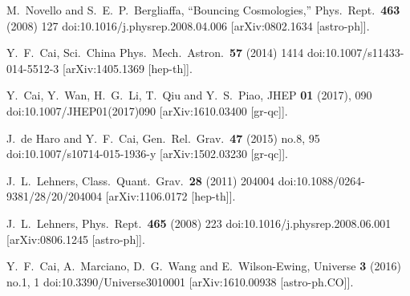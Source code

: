 \documentclass{article}
\begin{document}
\begin{thebibliography}{99}
M.~Novello and S.~E.~P.~Bergliaffa,
 ``Bouncing Cosmologies,''
Phys.\ Rept.\ {\bf 463} (2008) 127
doi:10.1016/j.physrep.2008.04.006
[arXiv:0802.1634 [astro-ph]].


Y.~F.~Cai,
Sci.\ China Phys.\ Mech.\ Astron.\  {\bf 57} (2014) 1414
doi:10.1007/s11433-014-5512-3
[arXiv:1405.1369 [hep-th]].


Y.~Cai, Y.~Wan, H.~G.~Li, T.~Qiu and Y.~S.~Piao,
JHEP \textbf{01} (2017), 090
doi:10.1007/JHEP01(2017)090
[arXiv:1610.03400 [gr-qc]].




J.~de Haro and Y.~F.~Cai,
Gen.\ Rel.\ Grav.\ {\bf 47} (2015) no.8, 95
doi:10.1007/s10714-015-1936-y
[arXiv:1502.03230 [gr-qc]].






J.~L.~Lehners,
Class.\ Quant.\ Grav.\ {\bf 28} (2011) 204004
doi:10.1088/0264-9381/28/20/204004
[arXiv:1106.0172 [hep-th]].



J.~L.~Lehners,
Phys.\ Rept.\ {\bf 465} (2008) 223
doi:10.1016/j.physrep.2008.06.001
[arXiv:0806.1245 [astro-ph]].


Y.~F.~Cai, A.~Marciano, D.~G.~Wang and E.~Wilson-Ewing,
Universe {\bf 3} (2016) no.1,  1 doi:10.3390/Universe3010001
[arXiv:1610.00938 [astro-ph.CO]].



\end{thebibliography}
\end{document}
